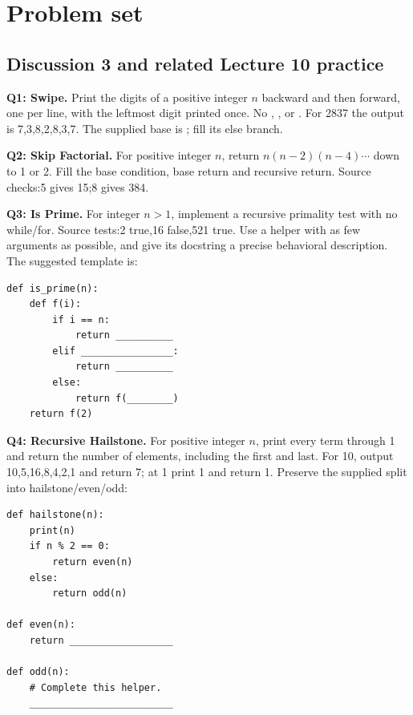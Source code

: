\section{Problem set}
\subsection{Discussion 3 and related Lecture 10 practice}
\begin{prob}
\textbf{Q1: Swipe.} Print the digits of a positive integer $n$ backward and then forward, one per line, with the leftmost digit printed once. No , , or . For 2837 the output is 7,3,8,2,8,3,7. The supplied base is ; fill its else branch.\par
{}
\end{prob}
\begin{prob}
\textbf{Q2: Skip Factorial.} For positive integer $n$, return $n(n-2)(n-4)\cdots$ down to 1 or 2. Fill the base condition, base return and recursive return. Source checks:5 gives 15;8 gives 384.\par
{}
\end{prob}
\begin{prob}
\textbf{Q3: Is Prime.} For integer $n>1$, implement a recursive primality test with no while/for. Source tests:2 true,16 false,521 true. Use a helper with as few arguments as possible, and give its docstring a precise behavioral description. The suggested template is:
\begin{lstlisting}
def is_prime(n):
    def f(i):
        if i == n:
            return __________
        elif ________________:
            return __________
        else:
            return f(________)
    return f(2)
\end{lstlisting}
\end{prob}
\begin{prob}
\textbf{Q4: Recursive Hailstone.} For positive integer $n$, print every term through 1 and return the number of elements, including the first and last. For 10, output 10,5,16,8,4,2,1 and return 7; at 1 print 1 and return 1. Preserve the supplied split into hailstone/even/odd:
\begin{lstlisting}
def hailstone(n):
    print(n)
    if n % 2 == 0:
        return even(n)
    else:
        return odd(n)

def even(n):
    return __________________

def odd(n):
    # Complete this helper.
    _________________________
\end{lstlisting}
\end{prob}
